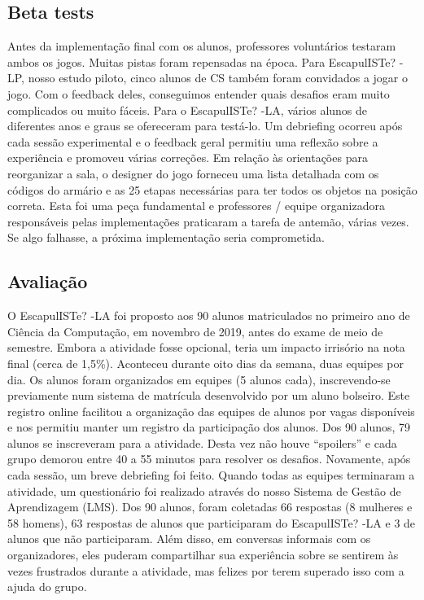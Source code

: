\subsection{Beta tests}

Antes da implementação final com os alunos, professores voluntários testaram ambos os jogos. Muitas pistas foram repensadas na época. Para EscapulISTe? -LP, nosso estudo piloto, cinco alunos de CS também foram convidados a jogar o jogo. Com o feedback deles, conseguimos entender quais desafios eram muito complicados ou muito fáceis. Para o EscapulISTe? -LA, vários alunos de diferentes anos e graus se ofereceram para testá-lo. Um debriefing ocorreu após cada sessão experimental e o feedback geral permitiu uma reflexão sobre a experiência e promoveu várias correções. Em relação às orientações para reorganizar a sala, o designer do jogo forneceu uma lista detalhada com os códigos do armário e as 25 etapas necessárias para ter todos os objetos na posição correta. Esta foi uma peça fundamental e professores / equipe organizadora responsáveis pelas implementações praticaram a tarefa de antemão, várias vezes. Se algo falhasse, a próxima implementação seria comprometida.

\subsection{Avaliação}

O EscapulISTe? -LA foi proposto aos 90 alunos matriculados no primeiro ano de Ciência da Computação, em novembro de 2019, antes do exame de meio de semestre. Embora a atividade fosse opcional, teria um impacto irrisório na nota final (cerca de 1,5\%). Aconteceu durante oito dias da semana, duas equipes por dia. Os alunos foram organizados em equipes (5 alunos cada), inscrevendo-se previamente num sistema de matrícula desenvolvido por um aluno bolseiro. Este registro online facilitou a organização das equipes de alunos por vagas disponíveis e nos permitiu manter um registro da participação dos alunos. Dos 90 alunos, 79 alunos se inscreveram para a atividade. Desta vez não houve “spoilers” e cada grupo demorou entre 40 a 55 minutos para resolver os desafios. Novamente, após cada sessão, um breve debriefing foi feito. Quando todas as equipes terminaram a atividade, um questionário foi realizado através do nosso Sistema de Gestão de Aprendizagem (LMS). Dos 90 alunos, foram coletadas 66 respostas (8 mulheres e 58 homens), 63 respostas de alunos que participaram do EscapulISTe? -LA e 3 de alunos que não participaram. Além disso, em conversas informais com os organizadores, eles puderam compartilhar sua experiência sobre se sentirem às vezes frustrados durante a atividade, mas felizes por terem superado isso com a ajuda do grupo.



